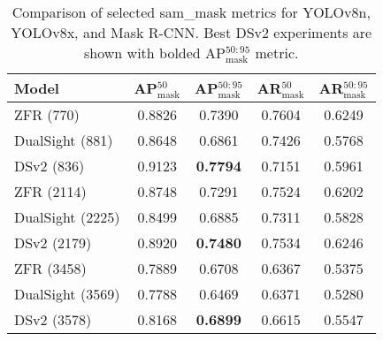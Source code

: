 
\begin{table}[h!]
\centering
\begin{tabular}{l|c|c|c|c}
\toprule
\textbf{Model} & \textbf{AP$^{50}_{\text{mask}}$} & \textbf{AP$^{50:95}_{\text{mask}}$} & \textbf{AR$^{50}_{\text{mask}}$} & \textbf{AR$^{50:95}_{\text{mask}}$} \\ \midrule
ZFR (770) & 0.8826 & 0.7390 & 0.7604 & 0.6249 \\ 
DualSight (881) & 0.8648 & 0.6861 & 0.7426 & 0.5768 \\ 
DSv2 (836) & 0.9123 & \textbf{0.7794} & 0.7151 & 0.5961 \\ 
ZFR (2114) & 0.8748 & 0.7291 & 0.7524 & 0.6202 \\ 
DualSight (2225) & 0.8499 & 0.6885 & 0.7311 & 0.5828 \\ 
DSv2 (2179) & 0.8920 & \textbf{0.7480} & 0.7534 & 0.6246 \\ 
ZFR (3458) & 0.7889 & 0.6708 & 0.6367 & 0.5375 \\ 
DualSight (3569) & 0.7788 & 0.6469 & 0.6371 & 0.5280 \\ 
DSv2 (3578) & 0.8168 & \textbf{0.6899} & 0.6615 & 0.5547 \\ 

\bottomrule
\end{tabular}
\caption{Comparison of selected sam\_mask metrics for YOLOv8n, YOLOv8x, and Mask R-CNN. 
Best DSv2 experiments are shown with bolded AP$^{50:95}_{\text{mask}}$ metric.}
\label{tab:mini_comparison}
\end{table}
